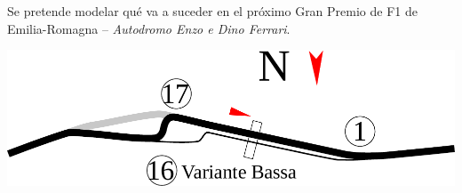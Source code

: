 \documentclass{upmassignment}
\date{\today}
\begin{document}
Se pretende modelar qué va a suceder en
el próximo Gran Premio de F1 de
Emilia-Romagna --
\textit{Autodromo Enzo e Dino Ferrari}.

\vspace{1em}

\begin{minipage}{\textwidth}
    \centering
    \includegraphics[width=\textwidth]{figs/box-pitlane.pdf}
\end{minipage}
\end{document}
